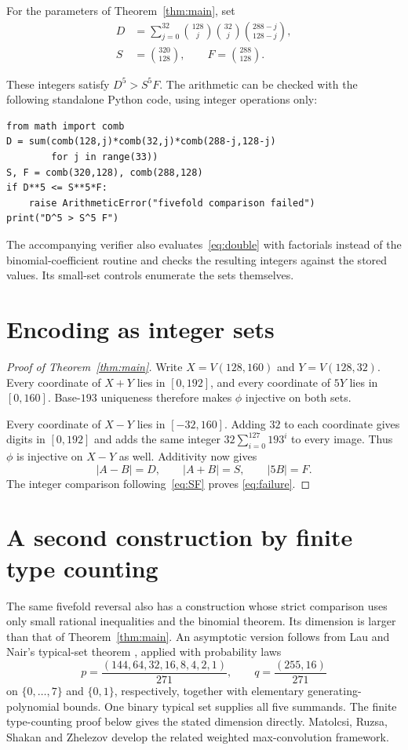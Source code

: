 \documentclass[11pt,a4paper]{article}
\newcommand{\V}{V}
\begin{document}
For the parameters of Theorem~\ref{thm:main}, set
\begin{align}
 D&=\sum_{j=0}^{32}
      \binom{128}{j}\binom{32}{j}\binom{288-j}{128-j},\label{eq:D}\\
 S&=\binom{320}{128},\qquad
 F=\binom{288}{128}.\label{eq:SF}
\end{align}
\begin{samepage}
These integers satisfy $D^5>S^5F$. The arithmetic can be checked with
the following standalone Python code, using integer operations only:
\begin{verbatim}
from math import comb
D = sum(comb(128,j)*comb(32,j)*comb(288-j,128-j)
        for j in range(33))
S, F = comb(320,128), comb(288,128)
if D**5 <= S**5*F:
    raise ArithmeticError("fivefold comparison failed")
print("D^5 > S^5 F")
\end{verbatim}
\end{samepage}
The accompanying verifier also evaluates~\eqref{eq:double} with
factorials instead of the binomial-coefficient routine and checks
the resulting integers against the stored values. Its small-set
controls enumerate the sets themselves.

\section{Encoding as integer sets}
\begin{proof}[Proof of Theorem~\ref{thm:main}]
Write $X=\V(128,160)$ and $Y=\V(128,32)$.
Every coordinate of $X+Y$ lies in $[0,192]$, and every coordinate
of $5Y$ lies in $[0,160]$. Base-$193$ uniqueness therefore makes
$\phi$ injective on both sets.

Every coordinate of $X-Y$ lies in $[-32,160]$. Adding $32$ to
each coordinate gives digits in $[0,192]$ and adds the same integer
$32\sum_{i=0}^{127}193^i$ to every image. Thus $\phi$ is injective
on $X-Y$ as well. Additivity now gives
\[
 |A-B|=D,\qquad |A+B|=S,\qquad |5B|=F.
\]
The integer comparison following~\eqref{eq:SF} proves
\eqref{eq:failure}.
\end{proof}

\section{A second construction by finite type counting}
\label{sec:binary-type}
The same fivefold reversal also has a construction whose strict comparison
uses only small rational inequalities and the binomial theorem. Its
dimension is larger than that of Theorem~\ref{thm:main}.
An asymptotic version follows from Lau and Nair's typical-set theorem
\cite[Theorem~10, Appendix~C]{launair}, applied with probability laws
\[
 p=\frac{(144,64,32,16,8,4,2,1)}{271},\qquad
 q=\frac{(255,16)}{271}
\]
on $\{0,\ldots,7\}$ and $\{0,1\}$, respectively, together with
elementary generating-polynomial bounds. One binary typical set supplies
all five summands. The finite type-counting proof below gives the stated
dimension directly. Matolcsi, Ruzsa, Shakan and Zhelezov
\cite[Section~8]{mrsz} develop the related weighted max-convolution
framework.
\end{document}
